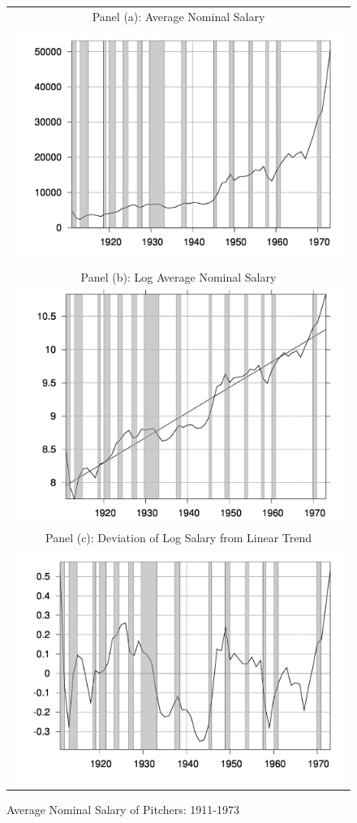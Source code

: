 \documentclass[12pt]{article}
\begin{document}
\begin{figure}\caption{Average Nominal Salary of Pitchers: 1911-1973}\label{fg:saldata} 
\begin{center}
\begin{tabular}{c}
Panel (a): Average Nominal Salary \\
\includegraphics[scale=0.18]{avesals.png} \\
Panel (b): Log Average Nominal Salary \\
\includegraphics[scale=0.18]{logfitsals.png} \\
Panel (c): Deviation of Log Salary from Linear Trend \\
\includegraphics[scale=0.18]{salsres.png} 

\end{tabular}
\end{center}
\end{figure}
\end{document}
